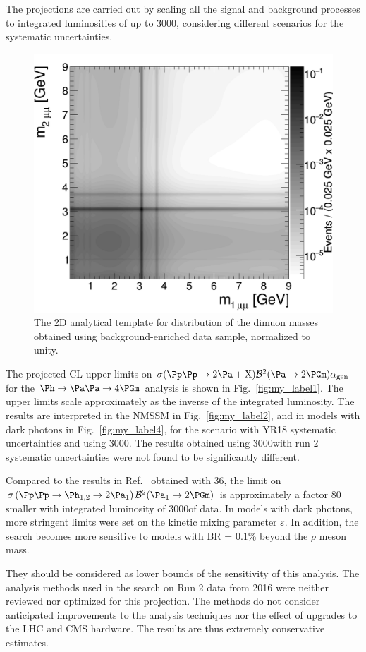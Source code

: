 The projections are carried out by scaling all the signal and background processes to integrated luminosities of up to 3000\fbinv, considering different scenarios for the
systematic uncertainties. 


\begin{figure}[tb]
\begin{center}
\includegraphics[width=0.52\linewidth]{plots/h2_background.png}
\end{center}
\caption{The 2D analytical template for distribution of the dimuon masses obtained using background-enriched data sample, normalized to unity. \label{fig:2dtemplate}}
\end{figure}

The projected CL upper limits on ${\sigma(\Pp\Pp \to 2 \Pa + \PX)  \mathcal{B}^2 (\Pa \to 2\PGm)  \alphaGen}$ for the $\Ph\to\Pa\Pa\to4\PGm$ analysis is shown in Fig.~\ref{fig:my_label1}. The upper limits scale approximately as the inverse of the integrated luminosity. The results are interpreted in the NMSSM in Fig.~\ref{fig:my_label2}, and in models with dark photons in Fig.~\ref{fig:my_label4}, for the scenario with YR18 systematic uncertainties and using 3000\fbinv. The results obtained using 3000\fbinv with run 2 systematic uncertainties were not found to be significantly different.

Compared to the results in Ref.~\cite{CMS-PAS-HIG-18-003} obtained with 36\fbinv, the limit on $\sigma \left( \Pp\Pp \to \PhOneTwo \to 2 \PaOne \right) \mathcal{B}^2(\PaOne \to 2\PGm)$ is approximately a factor 80 smaller with integrated luminosity of 3000\fbinv of data. In models with dark photons, more stringent limits were set on the kinetic mixing parameter $\varepsilon$. In addition, the search becomes more sensitive to models with BR = 0.1\% beyond the $\rho$ meson mass.

They should be considered as lower bounds of the sensitivity of this analysis. The analysis methods used in the search on Run 2 data from 2016 were neither reviewed nor optimized for this projection. The methods do not consider anticipated improvements to the analysis techniques nor the effect of upgrades to the LHC and CMS hardware. The results are thus extremely conservative estimates.

